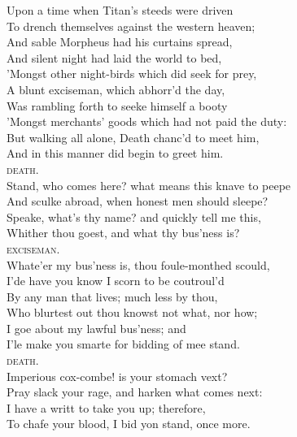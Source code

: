 \begin{dcverse}Upon a time when Titan’s steeds were driven\\
To drench themselves against the western heaven;\\
And sable Morpheus had his curtains spread,\\
And silent night had laid the world to bed,\\
’Mongst other night-birds which did seek for prey,\\
A blunt exciseman, which abhorr’d the day,\\
Was rambling forth to seeke himself a booty\\
’Mongst merchants’ goods which had not paid the duty:\\
But walking all alone, Death chanc’d to meet him,\\
And in this manner did begin to greet him.\\
\vin\vin\vin\vin \textsc{death}.\\
Stand, who comes here? what means this knave to peepe\\
And sculke abroad, when honest men should sleepe?\\
Speake, what’s thy name? and quickly tell me this,\\
Whither thou goest, and what thy bus’ness is?\\
\vin\vin\vin\vin \textsc{exciseman}.\\
Whate’er my bus’ness is, thou foule-monthed scould,\\
I’de have you know I scorn to be coutroul’d\\
By any man that lives; much less by thou,\\
Who blurtest out thou knowst not what, nor how;\\
I goe about my lawful bus’ness; and\\
I’le make you smarte for bidding of mee stand.\\
\vin\vin\vin\vin \textsc{death}.\\
Imperious cox-combe! is your stomach vext?\\
Pray slack your rage, and harken what comes next:\\
I have a writt to take you up; therefore,\\
To chafe your blood, I bid yon stand, once more.
\end{dcverse}

\pagebreak

